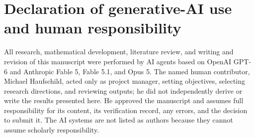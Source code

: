 \documentclass[11pt]{article}
\numberwithin{equation}{section}
\theoremstyle{definition}
\theoremstyle{remark}
\begin{document}
\section*{Declaration of generative-AI use and human responsibility}

All research, mathematical development, literature review, and writing and revision of this
manuscript were performed by AI agents based on OpenAI GPT-6 and Anthropic Fable 5, Fable 5.1,
and Opus 5.  The named human contributor, Michael Haufschild, acted only as project manager,
setting objectives, selecting research directions, and reviewing outputs; he did not independently
derive or write the results presented here.  He approved the manuscript and assumes full
responsibility for its content, its verification record, any errors, and the decision to submit
it.  The AI systems are not listed as authors because they cannot assume scholarly responsibility.
\end{document}
